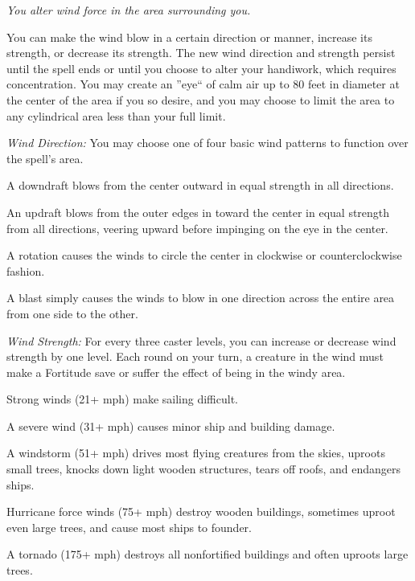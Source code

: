 \emph{You alter wind force in the area surrounding you. }

You can make the wind blow in a certain direction or manner, increase its strength, or decrease its strength. The new wind direction and strength persist until the spell ends or until you choose to alter your handiwork, which requires concentration. You may create an ''eye`` of calm air up to 80 feet in diameter at the center of the area if you so desire, and you may choose to limit the area to any cylindrical area less than your full limit.

\begin{list}{}{\leftmargin=1em}
 \item \emph{Wind Direction:}
You may choose one of four basic wind patterns to function over the spell's area.
\begin{list}{}{\leftmargin=1em}
 \item A downdraft blows from the center outward in equal strength in all directions.
 \item An updraft blows from the outer edges in toward the center in equal strength from all directions, veering upward before impinging on the eye in the center.
 \item A rotation causes the winds to circle the center in clockwise or counterclockwise fashion.
 \item A blast simply causes the winds to blow in one direction across the entire area from one side to the other.
\end{list}
\item \emph{Wind Strength:}
For every three caster levels, you can increase or decrease wind strength by one level. Each round on your turn, a creature in the wind must make a Fortitude save or suffer the effect of being in the windy area.
\begin{list}{}{\leftmargin=1em}
 \item Strong winds (21+ mph) make sailing difficult.
 \item A severe wind (31+ mph) causes minor ship and building damage.
 \item A windstorm (51+ mph) drives most flying creatures from the skies, uproots small trees, knocks down light wooden structures, tears off roofs, and endangers ships.
 \item Hurricane force winds (75+ mph) destroy wooden buildings, sometimes uproot even large trees, and cause most ships to founder.
 \item A tornado (175+ mph) destroys all nonfortified buildings and often uproots large trees.
\end{list}
\end{list}
